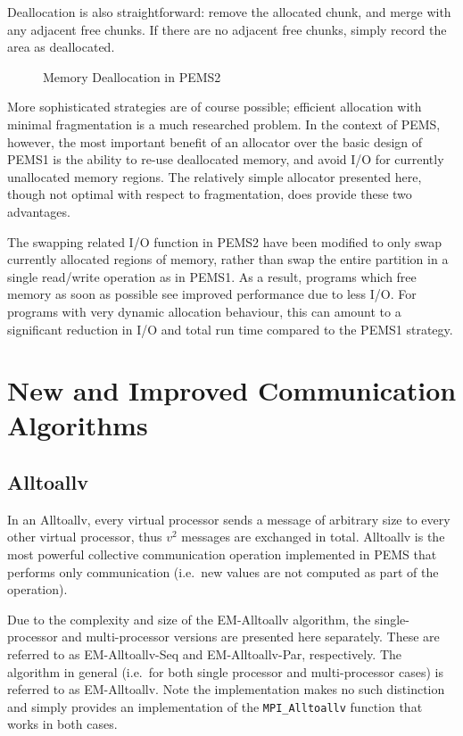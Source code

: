 \documentclass[12pt]{carletoncsthesis}
\begin{document}
Deallocation is also straightforward: remove the allocated chunk, and merge
with any adjacent free chunks.  If there are no adjacent free chunks, simply
record the area as deallocated.

\begin{figure}[h]
\begin{center}
\end{center}
\caption{Memory Deallocation in PEMS2}
\label{pems2-deallocation-fig}
\end{figure}

More sophisticated strategies are of course possible; efficient allocation
with minimal fragmentation is a much researched problem.  In the context
of PEMS, however, the most important benefit of an allocator over the basic
design of PEMS1 is the ability to re-use deallocated memory, and avoid I/O
for currently unallocated memory regions.  The relatively simple allocator
presented here, though not optimal with respect to fragmentation, does
provide these two advantages.

The swapping related I/O function in PEMS2 have been modified to only swap
currently allocated regions of memory, rather than swap the entire partition
in a single read/write operation as in PEMS1.  As a result, programs which
free memory as soon as possible see improved performance due to less I/O.
For programs with very dynamic allocation behaviour, this can amount to a
significant reduction in I/O and total run time compared to the PEMS1 strategy.



\chapter{New and Improved Communication Algorithms}
\thispagestyle{empty}
\label{comm-algs}


\section{Alltoallv}


In an {\sc Alltoallv}, every virtual processor sends a message of arbitrary
size to every other virtual processor, thus $v^2$ messages are exchanged
in total.  {\sc Alltoallv} is the most powerful collective communication
operation implemented in PEMS that performs only communication (i.e.\ new
values are not computed as part of the operation).

Due to the complexity and size of the {\sc EM-Alltoallv} algorithm, the
single-processor and multi-processor versions are presented here separately.
These are referred to as {\sc EM-Alltoallv-Seq} and {\sc EM-Alltoallv-Par},
respectively.  The algorithm in general (i.e.\ for both single processor
and multi-processor cases) is referred to as {\sc EM-Alltoallv}.  Note the
implementation makes no such distinction and simply provides an implementation
of the {\tt MPI\_Alltoallv} function that works in both cases.
\end{document}
